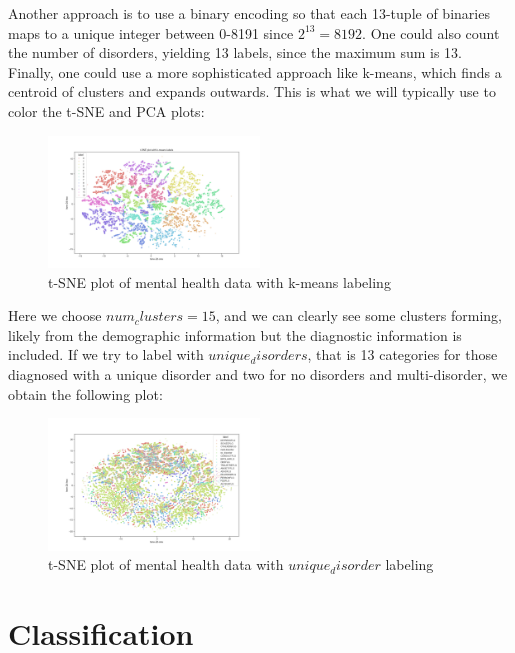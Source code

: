 \documentclass[11pt]{amsart}
\begin{document}
Another approach is to use a binary encoding so that each 13-tuple of binaries maps to a unique integer between 0-8191 since $2^{13} = 8192$. One could also count the number of disorders, yielding 13 labels, since the maximum sum is 13. Finally, one could use a more sophisticated approach like k-means, which finds a centroid of clusters and expands outwards. This is what we will typically use to color the t-SNE and PCA plots: \\

\begin{figure}[h]
\caption{t-SNE plot of mental health data with k-means labeling}
\centering
\includegraphics[width=0.5\textwidth]{t-sne_k-means_label.png}
\end{figure}

Here we choose $num_clusters=15$, and we can clearly see some clusters forming, likely from the demographic information but the diagnostic information is included. If we try to label with $unique_disorders$, that is 13 categories for those diagnosed with a unique disorder and two for no disorders and multi-disorder, we obtain the following plot:

\begin{figure}[h]
\caption{t-SNE plot of mental health data with $unique_disorder$ labeling}
\centering
\includegraphics[width=0.5\textwidth]{tsne-plot_unique-disorders_label.png}
\end{figure}

\section{Classification}
\end{document}
